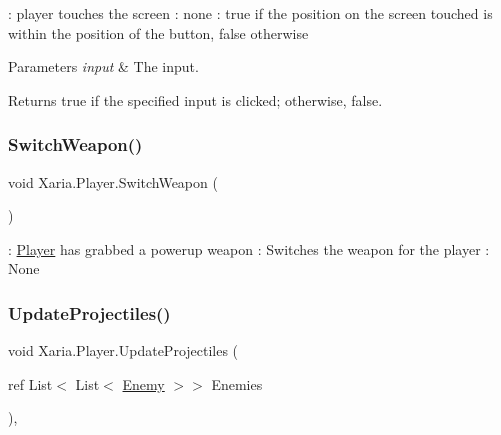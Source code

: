\+: player touches the screen \+: none \+: true if the position on the screen touched is within the position of the button, false otherwise 


\begin{DoxyParams}{Parameters}
{\em input} & The input.\\
\hline
\end{DoxyParams}
\begin{DoxyReturn}{Returns}
{\ttfamily true} if the specified input is clicked; otherwise, {\ttfamily false}. 
\end{DoxyReturn}
\mbox{\label{classXaria_1_1Player_a228a04fe0b09b56bf90bc0a459034bbf}} 
\subsubsection{\texorpdfstring{Switch\+Weapon()}{SwitchWeapon()}}
{\footnotesize\ttfamily void Xaria.\+Player.\+Switch\+Weapon (\begin{DoxyParamCaption}{ }\end{DoxyParamCaption})\hspace{0.3cm}{\ttfamily [inline]}}



\+: \hyperlink{classXaria_1_1Player}{Player} has grabbed a powerup weapon \+: Switches the weapon for the player \+: None 

\mbox{\label{classXaria_1_1Player_a2604251ff8bb846e1c3cbc5f05e09be2}} 
\subsubsection{\texorpdfstring{Update\+Projectiles()}{UpdateProjectiles()}}
{\footnotesize\ttfamily void Xaria.\+Player.\+Update\+Projectiles (\begin{DoxyParamCaption}\item[{ref List$<$ List$<$ \hyperlink{classXaria_1_1Enemy}{Enemy} $>$$>$}]{Enemies }\end{DoxyParamCaption})\hspace{0.3cm}{\ttfamily [inline]}, {\ttfamily [private]}}



